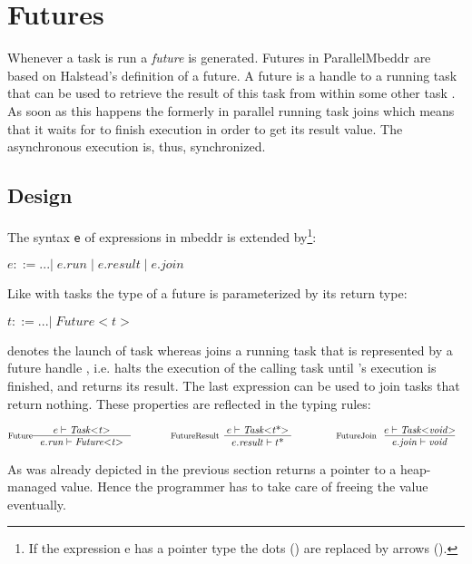 \section{Futures}
Whenever a task  is run a \textit{future} is generated. Futures in ParallelMbeddr are based on Halstead's definition of a future\cite{Halstead_Multilisp}. A future is a handle to a running task that can be used to retrieve the result of this task from within some other task . As soon as this happens the formerly in parallel running task  joins  which means that it waits for  to finish execution in order to get its result value. The asynchronous execution is, thus, synchronized.

\subsection{Design}
The syntax \texttt{e} of expressions in mbeddr is extended by\footnote{If the expression e has a pointer type the dots () are replaced by arrows (\CODE{->}).}:

$ e ::= ...|\;e.\mathit{run}\;|\;e.\mathit{result}\;|\;e.\mathit{join} $

Like with tasks the type of a future is parameterized by its return type:

$ t ::= ...|\;\mathit{Future{<}t{>}}$

 denotes the launch of task  whereas  joins a running task that is represented by a future handle , i.e. halts the execution of the calling task until 's execution is finished, and returns its result. The last expression  can be used to join tasks that return nothing. These properties are reflected in the typing rules:

\begin{center}
\begin{align*}
\inference*[Future]{e |- \mathit{Task{<}t{>}}}{e.\mathit{run} |- \mathit{Future{<}t{>}}}
\qquad\qquad
\inference*[FutureResult]{e |- \mathit{Task{<}t\text{*}{>}}}{e.\mathit{result} |- t\text{*}}
\qquad\qquad
\inference*[FutureJoin]{e |- \mathit{Task{<}void{>}}}{e.\mathit{join} |- \mathit{void}}
\end{align*}
\end{center}

As was already depicted in the previous section  
 returns a pointer to a heap-managed value. Hence the programmer has to take care of freeing the value eventually.

